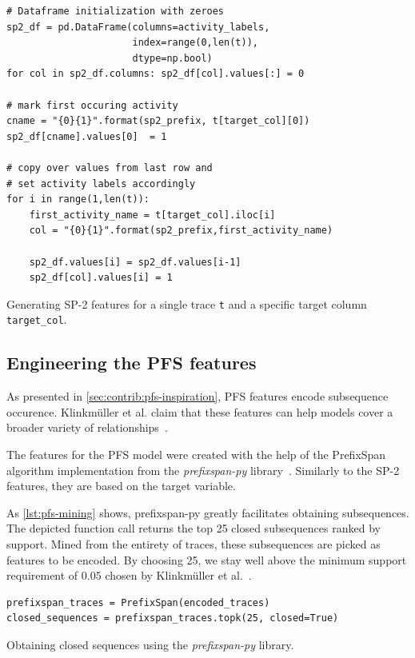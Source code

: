 \begin{listing}[ht]
\begin{verbatim}
# Dataframe initialization with zeroes
sp2_df = pd.DataFrame(columns=activity_labels,
                      index=range(0,len(t)),
                      dtype=np.bool)
for col in sp2_df.columns: sp2_df[col].values[:] = 0

# mark first occuring activity
cname = "{0}{1}".format(sp2_prefix, t[target_col][0])
sp2_df[cname].values[0]  = 1

# copy over values from last row and
# set activity labels accordingly
for i in range(1,len(t)):
    first_activity_name = t[target_col].iloc[i]
    col = "{0}{1}".format(sp2_prefix,first_activity_name)

    sp2_df.values[i] = sp2_df.values[i-1]
    sp2_df[col].values[i] = 1
\end{verbatim}
\caption{Generating SP-2 features for a single trace \texttt{t} and a specific target column \texttt{target\_col}.}
\label{lst:sp2-generation}
\end{listing}

\FloatBarrier
\subsection*{Engineering the PFS features}
As presented in \autoref{sec:contrib:pfs-inspiration}, PFS features encode subsequence occurence. Klinkmüller et al. claim that these features can help models cover a broader variety of relationships~\cite{klinkmuller2018reliablemonitoring}.

The features for the PFS model were created with the help of the PrefixSpan algorithm implementation from the \textit{prefixspan-py} library~\cite{web:prefixspan-py}. Similarly to the SP-2 features, they are based on the target variable.

As \autoref{lst:pfs-mining} shows, prefixspan-py greatly facilitates obtaining subsequences. The depicted function call returns the top 25 closed subsequences ranked by support. Mined from the entirety of traces, these subsequences are picked as features to be encoded. By choosing 25, we stay well above the minimum support requirement of $0.05$ chosen by Klinkmüller et al.~\cite{klinkmuller2018reliablemonitoring}.

\begin{listing}[ht]
\begin{verbatim}
prefixspan_traces = PrefixSpan(encoded_traces)
closed_sequences = prefixspan_traces.topk(25, closed=True)
\end{verbatim}
\caption{Obtaining closed sequences using the \textit{prefixspan-py} library.}
\label{lst:pfs-mining}
\end{listing}

